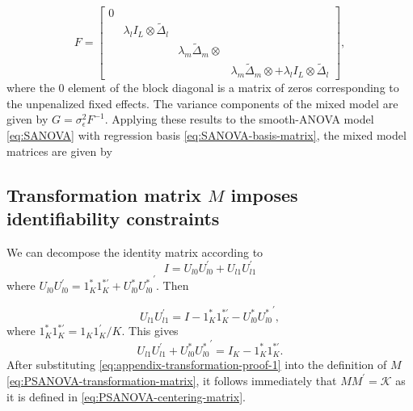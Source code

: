 \documentclass[12pt]{article}
\theoremstyle{definition}
\begin{document}
\begin{equation}
F = \begin{bmatrix}
0 	&	&	 & \\
	&  \lambda_l I_L \otimes \tilde{\Delta}_l  &	& \\
	&						& \lambda_m  \tilde{\Delta}_m\otimes & \\ 
&&&  \lambda_m  \tilde{\Delta}_m\otimes + \lambda_l I_L \otimes \tilde{\Delta}_l 
\end{bmatrix},
\end{equation} 
\noindent
where the $0$ element of the block diagonal is a matrix of zeros corresponding to the unpenalized fixed effects. The variance components of the mixed model are given by $G = \sigma_\epsilon^2 F^{-1}$. Applying these results to the smooth-ANOVA model \ref{eq:SANOVA} with regression basis \ref{eq:SANOVA-basis-matrix}, the mixed model matrices are given by 


\subsection{Transformation matrix $M$ imposes identifiability constraints} \label{subsection:transformation-centering-matrix-equivalence}

We can decompose the identity matrix according to 
\[
I = U_{l0}U_{l0}^\prime + U_{l1}U_{l1}^\prime
\]
where $U_{l0}U_{l0}^\prime = 1_K^* 1_K^{*\prime} + U_{l0}^*{U_{l0}^*}^\prime$. Then 

\begin{equation*} 
U_{l1}U_{l1}^\prime = I - 1_K^* 1_K^{*\prime} -  U_{l0}^*{U_{l0}^*}^\prime,
\end{equation*}
\noindent
where $1_K^* 1_K^{*\prime} = 1_K 1_K^{\prime}/K$. This gives
\begin{equation} \label{eq:appendix-transformation-proof-1} 
U_{l1}U_{l1}^\prime +  U_{l0}^*{U_{l0}^*}^\prime= I_K - 1_K^* 1_K^{*\prime}.
\end{equation}
After substituting \ref{eq:appendix-transformation-proof-1} into the definition of $M$ \ref{eq:PSANOVA-transformation-matrix}, it follows immediately that $MM^\prime = \mathscr{K}$ as it is defined in \ref{eq:PSANOVA-centering-matrix}.


\end{document}
